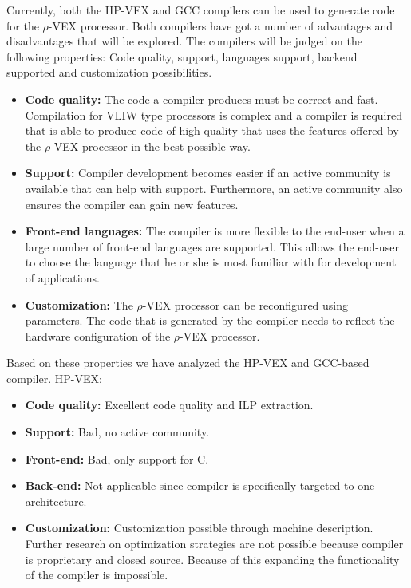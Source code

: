 Currently, both the HP-VEX and GCC compilers can be used to generate code for the $\rho$-VEX processor. Both compilers have got a number of advantages and disadvantages that will be explored. The compilers will be judged on the following properties: Code quality, support, languages support, backend supported and customization possibilities.

\begin{itemize}
	\item \textbf{Code quality:} The code a compiler produces must be correct and fast. Compilation for VLIW type processors is complex and a compiler is required that is able to produce code of high quality that uses the features offered by the $\rho$-VEX processor in the best possible way.  
	\item \textbf{Support:} Compiler development becomes easier if an active community is available that can help with support. Furthermore, an active community also ensures the compiler can gain new features.
	\item \textbf{Front-end languages:} The compiler is more flexible to the end-user when a large number of front-end languages are supported. This allows the end-user to choose the language that he or she is most familiar with for development of applications. 
	\item \textbf{Customization:} The $\rho$-VEX processor can be reconfigured using parameters. The code that is generated by the compiler needs to reflect the hardware configuration of the $\rho$-VEX processor.  
\end{itemize}

Based on these properties we have analyzed the HP-VEX and GCC-based compiler.
\newline
HP-VEX:
\begin{itemize}
	\item \textbf{Code quality:} Excellent code quality and ILP extraction.
	\item \textbf{Support:} Bad, no active community.
	\item \textbf{Front-end:} Bad, only support for C.
	\item \textbf{Back-end:} Not applicable since compiler is specifically targeted to one architecture.
	\item \textbf{Customization:} Customization possible through machine description. Further research on optimization strategies are not possible because compiler is proprietary and closed source. Because of this expanding the functionality of the compiler is impossible.
\end{itemize}

